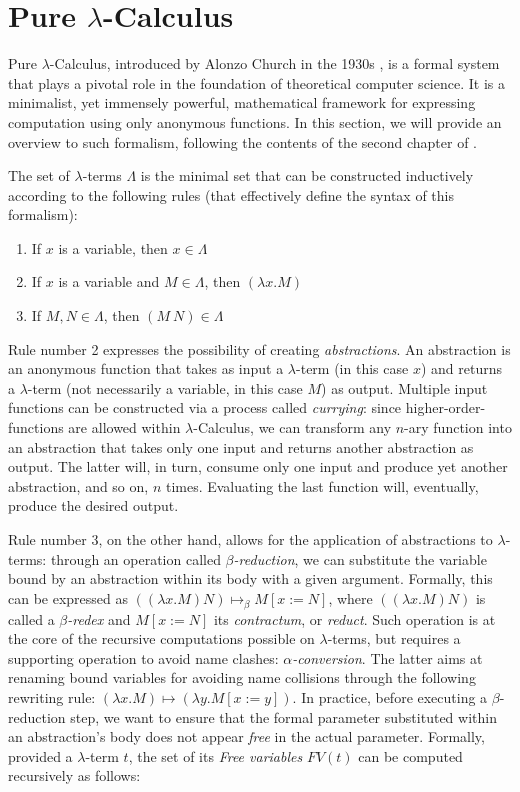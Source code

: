\documentclass{article}
\begin{document}
\section{Pure $\lambda$-Calculus} \label{sec:lambdaintro}

Pure $\lambda$-Calculus, introduced by Alonzo Church in the 1930s \cite{church}, is a formal system that plays a pivotal role in the foundation of theoretical computer science. It is a minimalist, yet immensely powerful, mathematical framework for expressing computation using only anonymous functions. In this section, we will provide an overview to such formalism, following the contents of the second chapter of \cite{barendregt}.

The set of $\lambda$-terms $\Lambda$ is the minimal set that can be constructed inductively according to the following rules (that effectively define the syntax of this formalism):

\begin{enumerate}
    \item If $x$ is a variable, then $x \in \Lambda$
    \item If $x$ is a variable and $M \in \Lambda$, then $(\lambda x . M)$
    \item If $M,N \in \Lambda$, then $(M\ N) \in \Lambda$
\end{enumerate}

Rule number 2 expresses the possibility of creating \textit{abstractions}. An abstraction is an anonymous function that takes as input a $\lambda$-term (in this case $x$) and returns a $\lambda$-term (not necessarily a variable, in this case $M$) as output. Multiple input functions can be constructed via a process called \textit{currying}: since higher-order-functions are allowed within $\lambda$-Calculus, we can transform any $n$-ary function into an abstraction that takes only one input and returns another abstraction as output. The latter will, in turn, consume only one input and produce yet another abstraction, and so on, $n$ times. Evaluating the last function will, eventually, produce the desired output.

Rule number 3, on the other hand, allows for the application of abstractions to $\lambda$-terms: through an operation called \textit{$\beta$-reduction}, we can substitute the variable bound by an abstraction within its body with a given argument. Formally, this can be expressed as $((\lambda x . M) N) \mapsto_\beta M[x := N]$, where $((\lambda x . M) N)$ is called a \textit{$\beta$-redex} and $M[x := N]$ its \textit{contractum}, or \textit{reduct}. Such operation is at the core of the recursive computations possible on $\lambda$-terms, but requires a supporting operation to avoid name clashes: \textit{$\alpha$-conversion}. The latter aims at renaming bound variables for avoiding name collisions through the following rewriting rule: $(\lambda x . M) \mapsto (\lambda y . M[x := y])$. In practice, before executing a $\beta$-reduction step, we want to ensure that the formal parameter substituted within an abstraction's body does not appear \textit{free} in the actual parameter. Formally, provided a $\lambda$-term $t$, the set of its \textit{Free variables} $FV(t)$ can be computed recursively as follows:
\end{document}
